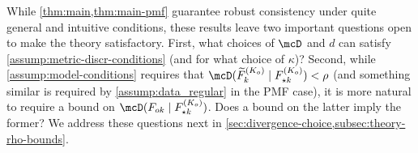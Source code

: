 While \cref{thm:main,thm:main-pmf} guarantee robust consistency under quite general and intuitive conditions, these results leave two important questions open to make the theory satisfactory.
First, what choices of $\mcD$ and $d$ can satisfy \cref{assump:metric-discr-conditions} (and for what choice of $\kappa$)?
Second, while \cref{assump:model-conditions} requires that $\discr{\widetilde{F}_{k}^{(K_{o})}}{F^{(K_{o})}_{\star k}} < \rho$
(and something similar is required by \cref{assump:data_regular} in the PMF case),
it is more natural to require a bound on $\discr{F_{ok}}{F^{(K_{o})}_{\star k}}$.
Does a bound on the latter imply the former?
We address these questions next in \cref{sec:divergence-choice,subsec:theory-rho-bounds}.


